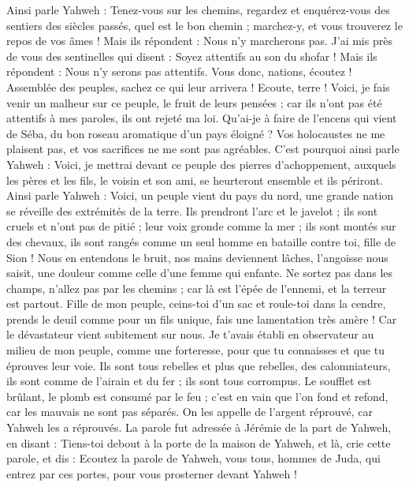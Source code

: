 \begin{multicols}{2}
Ainsi parle Yahweh : Tenez-vous sur les chemins, regardez et enquérez-vous des sentiers des siècles passés, quel est le bon chemin ; marchez-y, et vous trouverez le repos de vos âmes ! Mais ils répondent : Nous n'y marcherons pas.
J'ai mis près de vous des sentinelles qui disent : Soyez attentifs au son du shofar ! Mais ils répondent : Nous n'y serons pas attentifs.
Vous donc, nations, écoutez ! Assemblée des peuples, sachez ce qui leur arrivera !
Ecoute, terre ! Voici, je fais venir un malheur sur ce peuple, le fruit de leurs pensées ; car ils n'ont pas été attentifs à mes paroles, ils ont rejeté ma loi.
Qu'ai-je à faire de l'encens qui vient de Séba, du bon roseau aromatique d'un pays éloigné ? Vos holocaustes ne me plaisent pas, et vos sacrifices ne me sont pas agréables.
C'est pourquoi ainsi parle Yahweh : Voici, je mettrai devant ce peuple des pierres d'achoppement, auxquels les pères et les fils, le voisin et son ami, se heurteront ensemble et ils périront.
Ainsi parle Yahweh : Voici, un peuple vient du pays du nord, une grande nation se réveille des extrémités de la terre.
Ils prendront l'arc et le javelot ; ils sont cruels et n'ont pas de pitié ; leur voix gronde comme la mer ; ils sont montés sur des chevaux, ils sont rangés comme un seul homme en bataille contre toi, fille de Sion !
Nous en entendons le bruit, nos mains deviennent lâches, l'angoisse nous saisit, une douleur comme celle d'une femme qui enfante.
Ne sortez pas dans les champs, n'allez pas par les chemins ; car là est l'épée de l'ennemi, et la terreur est partout.
Fille de mon peuple, ceins-toi d'un sac et roule-toi dans la cendre, prends le deuil comme pour un fils unique, fais une lamentation très amère ! Car le dévastateur vient subitement sur nous.
Je t'avais établi en observateur au milieu de mon peuple, comme une forteresse, pour que tu connaisses et que tu éprouves leur voie.
Ils sont tous rebelles et plus que rebelles, des calomniateurs, ils sont comme de l'airain et du fer ; ils sont tous corrompus.
Le soufflet est brûlant, le plomb est consumé par le feu ; c'est en vain que l'on fond et refond, car les mauvais ne sont pas séparés.
On les appelle de l'argent réprouvé, car Yahweh les a réprouvés.
\VerseOne{}La parole fut adressée à Jérémie de la part de Yahweh, en disant :
Tiens-toi debout à la porte de la maison de Yahweh, et là, crie cette parole, et dis : Ecoutez la parole de Yahweh, vous tous, hommes de Juda, qui entrez par ces portes, pour vous prosterner devant Yahweh !

\end{multicols}
